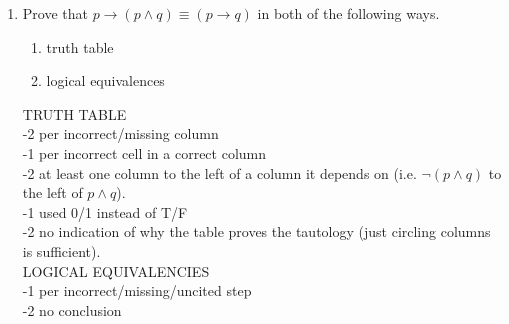 \begin{enumerate}
    
    \item Prove that $p\rightarrow(p\wedge q) \equiv (p \rightarrow q)$ in both of the following ways.
    \begin{enumerate}
        \item truth table 
        \item logical equivalences 
    \end{enumerate}
    \begin{rubric}
    TRUTH TABLE\\
    -2 per incorrect/missing column\\
    -1 per incorrect cell in a correct column\\
    -2 at least one column to the left of a column it depends on (i.e. $\lnot (p \wedge q)$ to the left of $p \wedge q$).\\
    -1 used 0/1 instead of T/F\\
    -2 no indication of why the table proves the tautology (just circling columns is sufficient).\\
    LOGICAL EQUIVALENCIES\\
    -1 per incorrect/missing/uncited step\\
    -2 no conclusion\\
    \end{rubric}
\end{enumerate}
